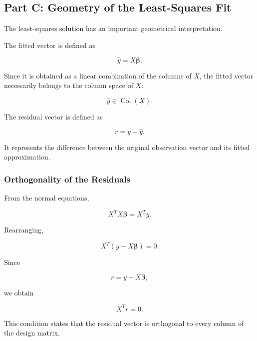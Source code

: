 \documentclass[12pt,a4paper]{article}
\numberwithin{equation}{section}
\begin{document}
\subsection{Part C: Geometry of the Least-Squares Fit}

The least-squares solution has an important
geometrical interpretation.

The fitted vector is defined as

\begin{equation}
\boxed{\hat{y}=X\boldsymbol{\beta}}.
\end{equation}

Since it is obtained as a linear combination
of the columns of $X$, the fitted vector
necessarily belongs to the column space of $X$:

\begin{equation}
\hat{y}\in\operatorname{Col}(X).
\end{equation}

The residual vector is defined as

\begin{equation}
\boxed{r=y-\hat{y}}.
\end{equation}

It represents the difference between the original
observation vector and its fitted approximation.

\subsubsection{Orthogonality of the Residuals}

From the normal equations,

\begin{equation}
X^TX\boldsymbol{\beta}=X^Ty.
\end{equation}

Rearranging,

\begin{equation}
X^T(y-X\boldsymbol{\beta})=0.
\end{equation}

Since

\begin{equation}
r=y-X\boldsymbol{\beta},
\end{equation}

we obtain

\begin{equation}
\boxed{X^Tr=0}.
\end{equation}

This condition states that the residual vector
is orthogonal to every column of the design matrix.
\end{document}
